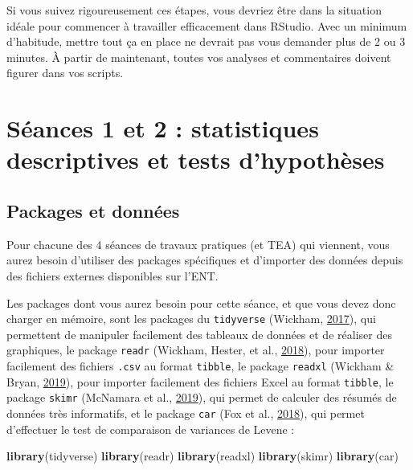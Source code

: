 \documentclass[a4paperpaper,]{article}
\newenvironment{Shaded}{\begin{snugshade}}{\end{snugshade}}
\newcommand{\KeywordTok}[1]{\textcolor[rgb]{0.12,0.11,0.11}{\textbf{#1}}}
\newcommand{\NormalTok}[1]{\textcolor[rgb]{0.12,0.11,0.11}{#1}}
\begin{document}
Si vous suivez rigoureusement ces étapes, vous devriez être dans la situation idéale pour commencer à travailler efficacement dans RStudio. Avec un minimum d'habitude, mettre tout ça en place ne devrait pas vous demander plus de 2 ou 3 minutes. À partir de maintenant, toutes vos analyses et commentaires doivent figurer dans vos scripts.

\hypertarget{seance1}{%
\section{Séances 1 et 2 : statistiques descriptives et tests d'hypothèses}\label{seance1}}

\hypertarget{packages}{%
\subsection{Packages et données}\label{packages}}

Pour chacune des 4 séances de travaux pratiques (et TEA) qui viennent, vous aurez besoin d'utiliser des packages spécifiques et d'importer des données depuis des fichiers externes disponibles sur l'ENT.

Les packages dont vous aurez besoin pour cette séance, et que vous devez donc charger en mémoire, sont les packages du \texttt{tidyverse} (Wickham, \protect\hyperlink{ref-R-tidyverse}{2017}), qui permettent de manipuler facilement des tableaux de données et de réaliser des graphiques, le package \texttt{readr} (Wickham, Hester, et al., \protect\hyperlink{ref-R-readr}{2018}), pour importer facilement des fichiers \texttt{.csv} au format \texttt{tibble}, le package \texttt{readxl} (Wickham \& Bryan, \protect\hyperlink{ref-R-readxl}{2019}), pour importer facilement des fichiers Excel au format \texttt{tibble}, le package \texttt{skimr} (McNamara et al., \protect\hyperlink{ref-R-skimr}{2019}), qui permet de calculer des résumés de données très informatifs, et le package \texttt{car} (Fox et al., \protect\hyperlink{ref-R-car}{2018}), qui permet d'effectuer le test de comparaison de variances de Levene :

\begin{Shaded}
\begin{Highlighting}[]
\KeywordTok{library}\NormalTok{(tidyverse)}
\KeywordTok{library}\NormalTok{(readr)}
\KeywordTok{library}\NormalTok{(readxl)}
\KeywordTok{library}\NormalTok{(skimr)}
\KeywordTok{library}\NormalTok{(car)}
\end{Highlighting}
\end{Shaded}
\end{document}
